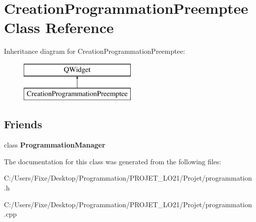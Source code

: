 \hypertarget{class_creation_programmation_preemptee}{}\section{Creation\+Programmation\+Preemptee Class Reference}
\label{class_creation_programmation_preemptee}
Inheritance diagram for Creation\+Programmation\+Preemptee\+:\begin{figure}[H]
\begin{center}
\leavevmode
\includegraphics[height=2.000000cm]{class_creation_programmation_preemptee}
\end{center}
\end{figure}
\subsection*{Friends}
\begin{DoxyCompactItemize}
\item 
\hypertarget{class_creation_programmation_preemptee_ade7bfcbf8cec66b12064c8ff25993d73}{}class {\bfseries Programmation\+Manager}\label{class_creation_programmation_preemptee_ade7bfcbf8cec66b12064c8ff25993d73}

\end{DoxyCompactItemize}


The documentation for this class was generated from the following files\+:\begin{DoxyCompactItemize}
\item 
C\+:/\+Users/\+Fixe/\+Desktop/\+Programmation/\+P\+R\+O\+J\+E\+T\+\_\+\+L\+O21/\+Projet/programmation.\+h\item 
C\+:/\+Users/\+Fixe/\+Desktop/\+Programmation/\+P\+R\+O\+J\+E\+T\+\_\+\+L\+O21/\+Projet/programmation.\+cpp\end{DoxyCompactItemize}
